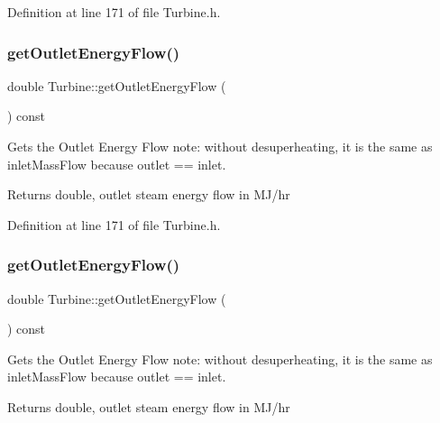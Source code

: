 Definition at line 171 of file Turbine.\+h.

\mbox{\label{class_turbine_aa20c0f9dd81cd9bfd5eda77f588516b5}} 
\subsubsection{\texorpdfstring{get\+Outlet\+Energy\+Flow()}{getOutletEnergyFlow()}\hspace{0.1cm}{\footnotesize\ttfamily [2/3]}}
{\footnotesize\ttfamily double Turbine\+::get\+Outlet\+Energy\+Flow (\begin{DoxyParamCaption}{ }\end{DoxyParamCaption}) const\hspace{0.3cm}{\ttfamily [inline]}}

Gets the Outlet Energy Flow note\+: without desuperheating, it is the same as inlet\+Mass\+Flow because outlet == inlet. \begin{DoxyReturn}{Returns}
double, outlet steam energy flow in M\+J/hr 
\end{DoxyReturn}


Definition at line 171 of file Turbine.\+h.

\mbox{\label{class_turbine_aa20c0f9dd81cd9bfd5eda77f588516b5}} 
\subsubsection{\texorpdfstring{get\+Outlet\+Energy\+Flow()}{getOutletEnergyFlow()}\hspace{0.1cm}{\footnotesize\ttfamily [3/3]}}
{\footnotesize\ttfamily double Turbine\+::get\+Outlet\+Energy\+Flow (\begin{DoxyParamCaption}{ }\end{DoxyParamCaption}) const\hspace{0.3cm}{\ttfamily [inline]}}

Gets the Outlet Energy Flow note\+: without desuperheating, it is the same as inlet\+Mass\+Flow because outlet == inlet. \begin{DoxyReturn}{Returns}
double, outlet steam energy flow in M\+J/hr 
\end{DoxyReturn}


